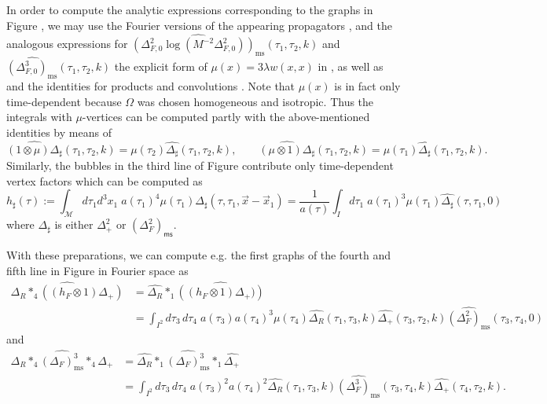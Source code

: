 \documentclass[10pt]{book}
\newcommand{\ms}{\mathsf{ms}}
\newcommand{\Mcal}{\mathcal{M}}
\theoremstyle{break}
\begin{document}
In order to compute the analytic expressions corresponding to the graphs in Figure %
, we may use the Fourier versions of the appearing propagators %
, and the analogous expressions for $\widehat{\left(\Delta^2_{F,0}\log\left(M^{-2}\Delta^2_{F,0}\right) \right)_\text{ms}}(\tau_1,\tau_2,k)$ and 
$\widehat{\left(\Delta^3_{F,0}\right)_\text{ms}}(\tau_1,\tau_2,k)$ the explicit form of $\mu(x)=3\lambda w(x,x)$ in %
, as well as %
and the identities for products and convolutions %
. Note that $\mu(x)$ is in fact only time-dependent because $\Omega$ was chosen homogeneous and isotropic. Thus the integrals with $\mu$-vertices can be computed partly with the above-mentioned identities by means of 
$$\widehat{(1\otimes \mu) \Delta_{\sharp}}(\tau_1,\tau_2,k)=\mu(\tau_2)\widehat{\Delta_{\sharp}}(\tau_1,\tau_2,k),\qquad\widehat{(\mu\otimes 1) \Delta_{\sharp}}(\tau_1,\tau_2,k)=\mu(\tau_1)\widehat{\Delta_{\sharp}}(\tau_1,\tau_2,k).$$
Similarly, the bubbles in the third line of Figure %
contribute only time-dependent vertex factors which can be computed as 
$$h_\sharp(\tau):=\int_\Mcal d\tau_1 d^3x_1\; a(\tau_1)^4\mu(\tau_1)\Delta_\sharp(\tau,\tau_1,\vec{x}-\vec{x}_1)=\frac{1}{a(\tau)}\int_I d\tau_1\;a(\tau_1)^3 \mu(\tau_1)\widehat{\Delta_\sharp}(\tau,\tau_1,0)$$
where $\Delta_\sharp$ is either $\Delta^2_+$ or $\left(\Delta^2_F\right)_\ms$.

With these preparations, we can compute e.g. the first graphs of the fourth and fifth line in Figure %
in Fourier space as
\begin{align*}
\widehat{\Delta_R\ast_4((h_F\otimes 1)\Delta_+)}&=\widehat{\Delta_R}\ast_1\widehat{\left((h_F\otimes 1)\Delta_+)\right)}\\
&=\int_{I^2} d\tau_3\,d\tau_4\; a(\tau_3)a(\tau_4)^3\mu(\tau_4)\widehat{\Delta_R}(\tau_1,\tau_3,k)\widehat{\Delta_+}(\tau_3,\tau_2,k)\widehat{(\Delta^2_F)_\text{ms}}(\tau_3,\tau_4,0)
\end{align*}
and
\begin{align*}
\widehat{\Delta_R\ast_4(\Delta_F)^3_\text{ms}\ast_4\Delta_+}&=\widehat{\Delta_R}\ast_1\widehat{(\Delta_F)^3_\text{ms}}\ast_1\widehat{\Delta_+}\\
&=\int_{I^2} d\tau_3\,d\tau_4\; a(\tau_3)^2a(\tau_4)^2\widehat{\Delta_R}(\tau_1,\tau_3,k)\widehat{(\Delta^3_F)_\text{ms}}(\tau_3,\tau_4,k)\widehat{\Delta_+}(\tau_4,\tau_2,k).
\end{align*}
\end{document}
